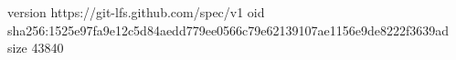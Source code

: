 version https://git-lfs.github.com/spec/v1
oid sha256:1525e97fa9e12c5d84aedd779ee0566c79e62139107ae1156e9de8222f3639ad
size 43840
